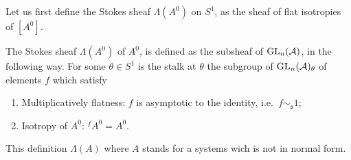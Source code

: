 Let us first define the Stokes sheaf $\Lambda(A^0)$ on $S^1$, as the sheaf of
flat isotropies of $[A^0]$.
\begin{defn}\label{defn:StokesSheaf}
  \begin{comment}
    The Stokes sheaf $\Lambda(A^0)$ of $A^0$, is the sheaf of groups defined on
    $S^1$ whose stalk at any point $\theta\in S^1$ is the group of germs of
    $f\in\Gl_n(\cO(\mathfrak{s}))$, $\mathfrak{s}$ a sector containing
    $\theta$, satisfying the conditions:
    \begin{enumerate}
      \item Flatness:
        $\underset{x\in\mathfrak{s}}{\underset{x\to0}{\lim}}f(x)=1$ and
        $f\sim_{\mathfrak{s}} 1$;
        \PROBLEM[Why two condition?]
      \item Isotropy of $A^0$: ${}^f\!A^0=A^0$.
    \end{enumerate}
  \end{comment}
  The Stokes sheaf $\Lambda(A^0)$ of $A^0$, is defined as the subsheaf of
  $\operatorname{GL}_n(\mathcal{A})$, in the following way.
  For some $\theta\in S^1$ is the stalk at $\theta$ the subgroup of
  $\operatorname{GL}_n(\mathcal{A})_\theta$ of elements $f$ which satisfy
  \begin{enumerate}
    \item Multiplicatively flatness: $f$ is asymptotic to the identity,
      i.e.\ $f\sim_{\mathfrak{s}} 1$;
    \item Isotropy of $A^0$: ${}^f\!A^0=A^0$.
  \end{enumerate}
  \begin{s-rem}
    This definition  $\Lambda(A)$ where $A$ stands
    for a systems wich is not in normal form.
  \end{s-rem}
  \iffalse
  \begin{comment}
    \begin{s-rem}
      \PROBLEM[remove? need more defs!]
      Sabbah \cite[110]{sabbah2007isomonodromic} talks about (global)
      meromorphic connections $\sM$ on a small disk $D$ around $0$ instead of
      germs of meromorphic connections.

      Define on $S^1$ the sheaf $\Aut^{<0}(\tilde\sM^{nf})$ of automorphisms of
      $\tilde\sM^{nf}:=\cA_D\otimes_{\cO_D}\sM^{nf}$ which
      \begin{itemize}
        \item are compatible with the connection and
        \item are formally equal to the identity, i.e.\ induce the identity on
          $\hat\sM^{nf}:=\hat\cO_D\otimes_{\cO_D}\sM^{nf}$
      \end{itemize}

      The sheaf $\Aut^{<0}(\tilde\sM^{nf})$ corresponds to our $\Lambda(A^0)$.
    \end{s-rem}
  \end{comment}
  \fi
\end{defn}

